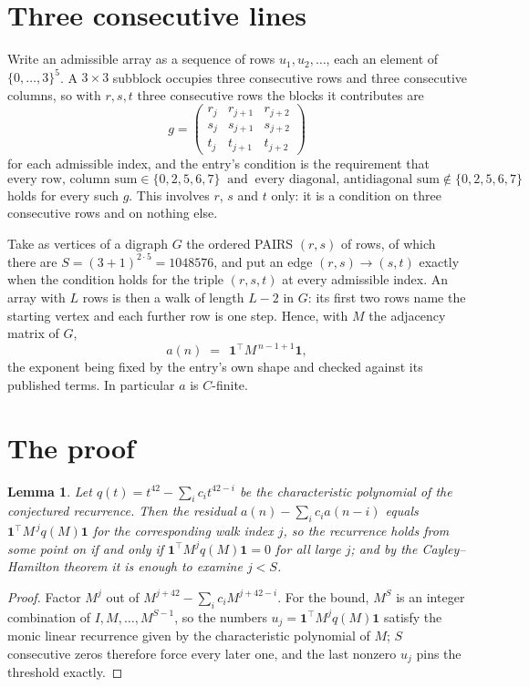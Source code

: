\documentclass[11pt,a4paper]{article}
\theoremstyle{plain}
\newtheorem{lemma}[theorem]{Lemma}
\theoremstyle{definition}
\begin{document}
\section{Three consecutive lines}

Write an admissible array as a sequence of rows $u_1,u_2,\dots$, each an element of
$\{0,\dots,3\}^{5}$. A $3\times3$ subblock occupies three consecutive rows and
three consecutive columns, so with $r,s,t$ three consecutive rows the blocks it
contributes are
\[
g=\begin{pmatrix}r_j&r_{j+1}&r_{j+2}\\ s_j&s_{j+1}&s_{j+2}\\ t_j&t_{j+1}&t_{j+2}\end{pmatrix}
\]
for each admissible index, and the entry's condition is the requirement that
\[
\text{every row, column sum} \in \{0,2,5,6,7\}\ \text{ and }\ \text{every diagonal, antidiagonal sum} \notin \{0,2,5,6,7\}
\]
holds for every such $g$. This involves $r$, $s$ and $t$ only: it is a condition on
three consecutive rows and on nothing else.

Take as vertices of a digraph $G$ the ordered PAIRS $(r,s)$ of rows, of which there are
$S=(3+1)^{2\cdot5}=1048576$, and put an edge $(r,s)\to(s,t)$ exactly when the condition
holds for the triple $(r,s,t)$ at every admissible index. An array with $L$ rows is then a
walk of length $L-2$ in $G$: its first two rows name the starting vertex and each further
row is one step. Hence, with $M$ the adjacency matrix of $G$,
\[
a(n)\;=\;\,\mathbf{1}^{\!\top}M^{\,n-1+1}\mathbf{1},
\]
the exponent being fixed by the entry's own shape and checked against its published terms.
In particular $a$ is $C$-finite.

\section{The proof}

\begin{lemma}\label{lem:crit}
Let $q(t)=t^{42}-\sum_i c_it^{42-i}$ be the characteristic polynomial of the
conjectured recurrence. Then the residual $a(n)-\sum_ic_ia(n-i)$ equals
$\mathbf{1}^{\!\top}M^{\,j}q(M)\mathbf{1}$ for the corresponding walk index
$j$, so the recurrence holds from some point on if and only if
$\mathbf{1}^{\!\top}M^{j}q(M)\mathbf{1}=0$ for all large $j$; and by the
Cayley--Hamilton theorem it is enough to examine $j<S$.
\end{lemma}

\begin{proof}
Factor $M^{j}$ out of $M^{j+42}-\sum_ic_iM^{j+42-i}$. For the bound, $M^{S}$
is an integer combination of $I,M,\dots,M^{S-1}$, so the numbers
$u_j=\mathbf{1}^{\!\top}M^{j}q(M)\mathbf{1}$ satisfy the monic linear recurrence given by
the characteristic polynomial of $M$; $S$ consecutive zeros therefore force every later one,
and the last nonzero $u_j$ pins the threshold exactly.
\end{proof}
\end{document}
